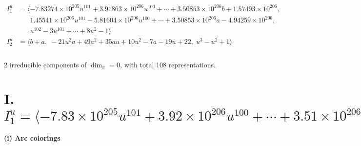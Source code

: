 \documentclass[1p]{elsarticle_modified}
\theoremstyle{definition}
\begin{document}
\begin{align*}
I^u_{1}&=\langle 
-7.83274\times10^{205} u^{101}+3.91863\times10^{206} u^{100}+\cdots+3.50853\times10^{206} b+1.57493\times10^{206},\\
\phantom{I^u_{1}}&\phantom{= \langle  }1.45541\times10^{206} u^{101}-5.81604\times10^{206} u^{100}+\cdots+3.50853\times10^{206} a-4.94259\times10^{206},\\
\phantom{I^u_{1}}&\phantom{= \langle  }u^{102}-3 u^{101}+\cdots+8 u^2-1\rangle \\
I^u_{2}&=\langle 
b+a,\;-21 u^2 a+49 a^2+35 a u+10 u^2-7 a-19 u+22,\;u^3- u^2+1\rangle \\
\\
\end{align*}
\raggedright * 2 irreducible components of $\dim_{\mathbb{C}}=0$, with total 108 representations.\\
\newpage
\renewcommand{\arraystretch}{1}
\centering \section*{I. $I^u_{1}= \langle -7.83\times10^{205} u^{101}+3.92\times10^{206} u^{100}+\cdots+3.51\times10^{206} b+1.57\times10^{206},\;1.46\times10^{206} u^{101}-5.82\times10^{206} u^{100}+\cdots+3.51\times10^{206} a-4.94\times10^{206},\;u^{102}-3 u^{101}+\cdots+8 u^2-1 \rangle$}
\flushleft \textbf{(i) Arc colorings}\\
\end{document}

